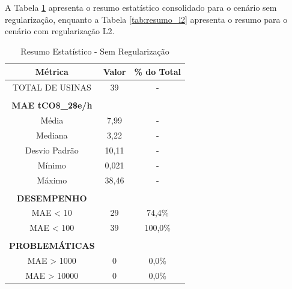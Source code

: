 A Tabela \ref{tab:resumo_padrao} apresenta o resumo estatístico consolidado para o cenário sem regularização, enquanto a Tabela \ref{tab:resumo_l2} apresenta o resumo para o cenário com regularização L2.

\begin{table}[H]
    \centering
    \renewcommand{\arraystretch}{2}
    \begin{tabular}{|ccc|}
    \hline
    \multicolumn{1}{|c|}{\textbf{Métrica}} & \multicolumn{1}{c|}{\textbf{Valor}} & \textbf{\% do Total} \\ \hline
    \multicolumn{1}{|c|}{TOTAL DE USINAS} & \multicolumn{1}{c|}{39} & - \\ \hline
    \multicolumn{3}{|c|}{} \\ \hline
    \multicolumn{1}{|c|}{\textbf{MAE \ac{tCO$_2$e}/h}} & \multicolumn{1}{c|}{} & \\ \hline
    \multicolumn{1}{|c|}{Média} & \multicolumn{1}{c|}{7,99} & - \\ \hline
    \multicolumn{1}{|c|}{Mediana} & \multicolumn{1}{c|}{3,22} & - \\ \hline
    \multicolumn{1}{|c|}{Desvio Padrão} & \multicolumn{1}{c|}{10,11} & - \\ \hline
    \multicolumn{1}{|c|}{Mínimo} & \multicolumn{1}{c|}{0,021} & - \\ \hline
    \multicolumn{1}{|c|}{Máximo} & \multicolumn{1}{c|}{38,46} & - \\ \hline
    \multicolumn{3}{|c|}{} \\ \hline
    \multicolumn{1}{|c|}{\textbf{DESEMPENHO}} & \multicolumn{1}{c|}{} & \\ \hline
    \multicolumn{1}{|c|}{MAE < 10} & \multicolumn{1}{c|}{29} & 74,4\% \\ \hline
    \multicolumn{1}{|c|}{MAE < 100} & \multicolumn{1}{c|}{39} & 100,0\% \\ \hline
    \multicolumn{3}{|c|}{} \\ \hline
    \multicolumn{1}{|c|}{\textbf{PROBLEMÁTICAS}} & \multicolumn{1}{c|}{} & \\ \hline
    \multicolumn{1}{|c|}{MAE > 1000} & \multicolumn{1}{c|}{0} & 0,0\% \\ \hline
    \multicolumn{1}{|c|}{MAE > 10000} & \multicolumn{1}{c|}{0} & 0,0\% \\ \hline
    \end{tabular}
    \caption{Resumo Estatístico - Sem Regularização}
    \label{tab:resumo_padrao}
\end{table}

